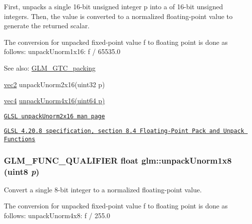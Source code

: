First, unpacks a single 16-bit unsigned integer p into a of 16-bit unsigned integers. Then, the value is converted to a normalized floating-point value to generate the returned scalar.

The conversion for unpacked fixed-point value f to floating point is done as follows: unpackUnorm1x16: f / 65535.0

\begin{Desc}
\item[See also:]\hyperlink{group__gtc__packing}{GLM\_\-GTC\_\-packing} 

\hyperlink{group__core__types_ga1618f51db67eaa145db101d8c8431d8}{vec2} unpackUnorm2x16(uint32 p) 

\hyperlink{group__core__types_g5881b1b022d7fd1b7218f5916532dd02}{vec4} \hyperlink{group__gtc__packing_gfb2b502bc406031a5618ce930139a9e3}{unpackUnorm4x16(uint64 p)} 

\href{http://www.opengl.org/sdk/docs/manglsl/xhtml/unpackUnorm2x16.xml}{\tt GLSL unpackUnorm2x16 man page} 

\href{http://www.opengl.org/registry/doc/GLSLangSpec.4.20.8.pdf}{\tt GLSL 4.20.8 specification, section 8.4 Floating-Point Pack and Unpack Functions} \end{Desc}
\hypertarget{group__gtc__packing_g32f3f2642df2ea87449d59fb614a8305}{
\subsubsection[unpackUnorm1x8]{\setlength{\rightskip}{0pt plus 5cm}GLM\_\-FUNC\_\-QUALIFIER float glm::unpackUnorm1x8 (uint8 {\em p})}}
\label{group__gtc__packing_g32f3f2642df2ea87449d59fb614a8305}


Convert a single 8-bit integer to a normalized floating-point value.

The conversion for unpacked fixed-point value f to floating point is done as follows: unpackUnorm4x8: f / 255.0

